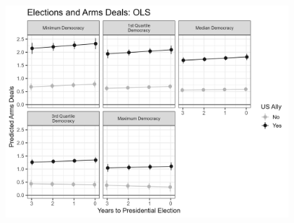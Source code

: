 \documentclass[12pt]{article}
\begin{document}
\begin{figure}[htpb]
	\centering
		\includegraphics[width=0.95\textwidth]{deals-pred-ols.png}
	\caption{}
	\label{fig:deals-pred-ols}
\end{figure}


\newpage
\singlespace
 
 
\end{document}
